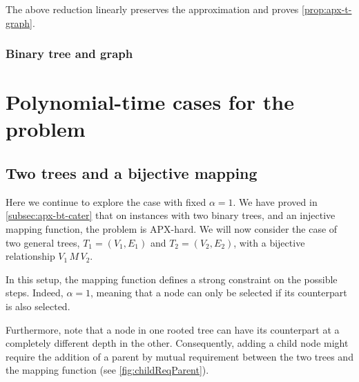 		The above reduction linearly preserves the approximation and proves \cref{prop:apx-t-graph}.

		\subsubsection{Binary tree and graph}
		\label{subsubsec:binary-tree}


	\section{Polynomial-time cases for the \mwccs{} problem}
	\label{sec:poly}

		\subsection{Two trees and a bijective mapping}
		\label{subsec:tree1o1}

			Here we continue to explore the case with fixed $\alpha = 1$.
			We have proved in \cref{subsec:apx-bt-cater} that on instances with two binary trees, and an injective mapping function, the problem is APX-hard.
			We will now consider the case of two general trees, $T_1 = (V_1, E_1)$ and $T_2 = (V_2, E_2)$, with a bijective relationship $V_1\,M\,V_2$.


			In this setup, the mapping function defines a strong constraint on the possible steps.
			Indeed, $\alpha=1$, meaning that a node can only be selected if its counterpart is also selected.

			Furthermore, note that a node in one rooted tree can have its counterpart at a completely different depth in the other.
			Consequently, adding a child node might require the addition of a parent by mutual requirement between the two trees and the mapping function (see \cref{fig:childReqParent}).

